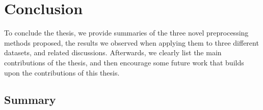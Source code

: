 \documentclass{statsmsc}
\begin{document}
{%
\chapter{Conclusion} %
\label{ch:Conclusion}

To conclude the thesis, we provide summaries of the three novel preprocessing methods proposed,
the results we observed when applying them to three different datasets, and related
discussions. Afterwards, we clearly list the main contributions of the thesis, and then
encourage some future work that builds upon the contributions of this thesis.

\section{Summary}%
\label{sec:Summary}

}
\end{document}

